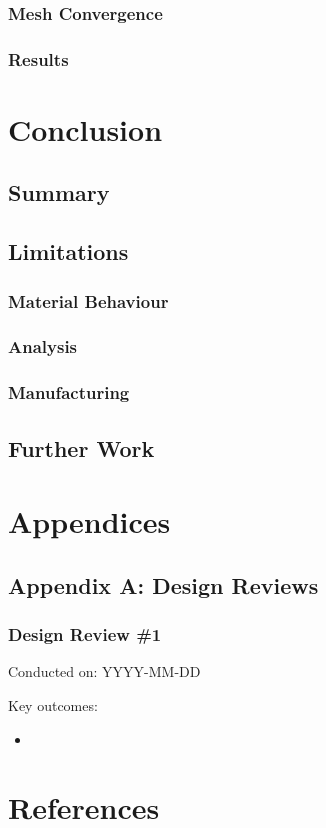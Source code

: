 \documentclass[10pt]{article}
\begin{document}
\subsubsection{Mesh Convergence}

\subsubsection{Results}

\section{Conclusion}
\subsection{Summary}

\subsection{Limitations}
\subsubsection{Material Behaviour}

\subsubsection{Analysis}

\subsubsection{Manufacturing}

\subsection{Further Work}

\section{Appendices}
\subsection{Appendix A\@: Design Reviews}
\subsubsection{Design Review \#1}
Conducted on: YYYY-MM-DD

Key outcomes:
\begin{itemize}[leftmargin=*]
    \item
\end{itemize}

\section{References}
\end{document}
